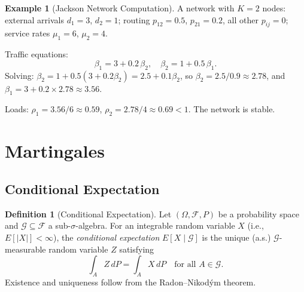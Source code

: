\documentclass[12pt, a4paper]{article}
\theoremstyle{definition}
\newtheorem{definition}{Definition}[section]
\newtheorem{example}{Example}[section]
\theoremstyle{plain}
\begin{document}
\begin{example}[Jackson Network Computation]
A network with $K=2$ nodes: external arrivals $d_1 = 3$, $d_2 = 1$; routing $p_{12} = 0.5$, $p_{21} = 0.2$, all other $p_{ij} = 0$; service rates $\mu_1 = 6$, $\mu_2 = 4$.

Traffic equations:
\[
  \beta_1 = 3 + 0.2\,\beta_2, \quad \beta_2 = 1 + 0.5\,\beta_1.
\]
Solving: $\beta_2 = 1 + 0.5(3 + 0.2\beta_2) = 2.5 + 0.1\beta_2$, so $\beta_2 = 2.5/0.9 \approx 2.78$, and $\beta_1 = 3 + 0.2 \times 2.78 \approx 3.56$.

Loads: $\rho_1 = 3.56/6 \approx 0.59$, $\rho_2 = 2.78/4 \approx 0.69 < 1$. The network is stable.
\end{example}


\section{Martingales}

\subsection{Conditional Expectation}

\begin{definition}[Conditional Expectation]
Let $(\Omega, \mathcal{F}, P)$ be a probability space and $\mathcal{G} \subseteq \mathcal{F}$ a sub-$\sigma$-algebra. For an integrable random variable $X$ (i.e., $E[|X|] < \infty$), the \emph{conditional expectation} $E[X \mid \mathcal{G}]$ is the unique (a.s.) $\mathcal{G}$-measurable random variable $Z$ satisfying
\[
  \int_A Z \, dP = \int_A X \, dP \quad \text{for all } A \in \mathcal{G}.
\]
Existence and uniqueness follow from the Radon--Nikod\'ym theorem.
\end{definition}
\end{document}
